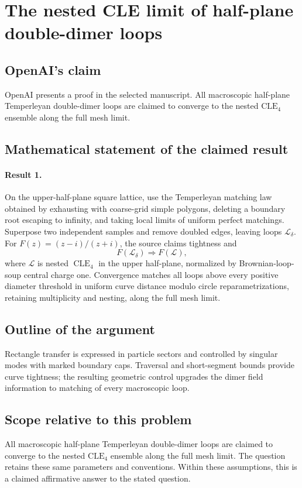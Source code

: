\documentclass[11pt]{article}
\begin{document}
\section*{The nested CLE limit of half-plane double-dimer loops}

\subsection{OpenAI's claim}
OpenAI presents a proof in the selected manuscript. All macroscopic half-plane Temperleyan double-dimer loops are claimed to converge to the nested $\mathrm{CLE}_4$ ensemble along the full mesh limit.

\subsection{Mathematical statement of the claimed result}
\paragraph{Result 1.} On the upper-half-plane square lattice, use the Temperleyan matching law obtained by exhausting with coarse-grid simple polygons, deleting a boundary root escaping to infinity, and taking local limits of uniform perfect matchings. Superpose two independent samples and remove doubled edges, leaving loops \(\mathcal L_\delta\). For \(F(z)=(z-i)/(z+i)\), the source claims tightness and
\[
 F(\mathcal L_\delta)\Longrightarrow F(\mathcal L),
\]
where \(\mathcal L\) is nested \(\operatorname{CLE}_4\) in the upper half-plane, normalized by Brownian-loop-soup central charge one. Convergence matches all loops above every positive diameter threshold in uniform curve distance modulo circle reparametrizations, retaining multiplicity and nesting, along the full mesh limit.

\subsection{Outline of the argument}
Rectangle transfer is expressed in particle sectors and controlled by singular modes with marked boundary caps. Traversal and short-segment bounds provide curve tightness; the resulting geometric control upgrades the dimer field information to matching of every macroscopic loop.

\subsection{Scope relative to this problem}
All macroscopic half-plane Temperleyan double-dimer loops are claimed to converge to the nested $\mathrm{CLE}_4$ ensemble along the full mesh limit. The question retains these same parameters and conventions. Within these assumptions, this is a claimed affirmative answer to the stated question.
\end{document}
